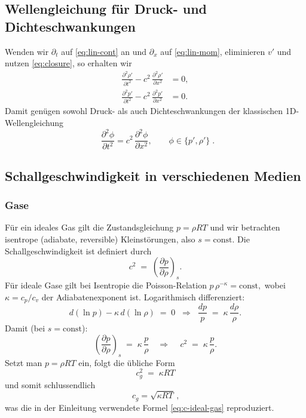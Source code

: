 \subsection{Wellengleichung für Druck- und Dichteschwankungen}
Wenden wir $\partial_t$ auf \eqref{eq:lin-cont} an und $\partial_x$ auf
\eqref{eq:lin-mom}, eliminieren $v'$ und nutzen \eqref{eq:closure},
so erhalten wir
\begin{align}
    \frac{\partial^2 \rho'}{\partial t^2} - c^2\,\frac{\partial^2 \rho'}{\partial x^2} &= 0, \\
    \frac{\partial^2 p'}{\partial t^2} - c^2\,\frac{\partial^2 p'}{\partial x^2} &= 0.
\end{align}
Damit genügen sowohl Druck- als auch Dichteschwankungen der klassischen
1D-Wellengleichung
\begin{equation}
    \;\;\frac{\partial^2 \phi}{\partial t^2} = c^2\,
    \frac{\partial^2 \phi}{\partial x^2}, \qquad \phi\in\{p',\rho'\}\; .
\end{equation}


\subsection{Schallgeschwindigkeit in verschiedenen Medien}

\subsubsection*{Gase}
Für ein ideales Gas gilt die Zustandsgleichung
\(
    p=\rho R T
\)
und wir betrachten isentrope (adiabate, reversible) Kleinstörungen, also \(s=\mathrm{const}\).
Die Schallgeschwindigkeit ist definiert durch
\[
    c^2 \;=\; \left(\frac{\partial p}{\partial \rho}\right)_{s}.
\]
Für ideale Gase gilt bei Isentropie die Poisson-Relation
\(
    p\,\rho^{-\kappa}=\mathrm{const},
\)
wobei \(\kappa=c_p/c_v\) der Adiabatenexponent ist.
Logarithmisch differenziert:
\[
    d(\ln p) - \kappa\, d(\ln \rho) \;=\; 0
    \;\;\Longrightarrow\;\;
    \frac{dp}{p} \;=\; \kappa\,\frac{d\rho}{\rho}.
\]
Damit (bei \(s=\mathrm{const}\)):
\[
    \left(\frac{\partial p}{\partial \rho}\right)_{s}
    \;=\; \kappa\,\frac{p}{\rho}
\quad\Longrightarrow\quad
    \,c^2 \;=\; \kappa\,\frac{p}{\rho}.
\]
Setzt man \(p=\rho R T\) ein, folgt die übliche Form
\[
    c_g^2 \;=\; \kappa R T
\]
und somit schlussendlich
\begin{equation}
    \,c_g=\sqrt{\kappa R T}\,,
\end{equation}
was die in der Einleitung verwendete Formel \eqref{eq:c-ideal-gas} reproduziert.

